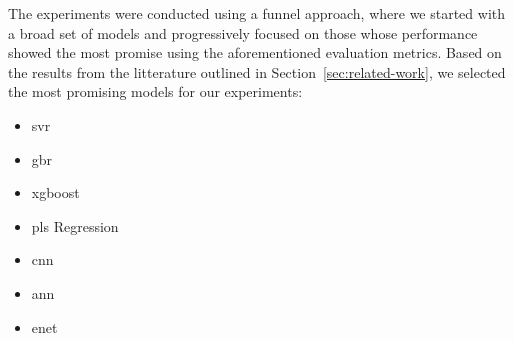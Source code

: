 The experiments were conducted using a funnel approach, where we started with a broad set of models and progressively focused on those whose performance showed the most promise using the aforementioned evaluation metrics.
Based on the results from the litterature outlined in Section~\ref{sec:related-work}, we selected the most promising models for our experiments:
\begin{itemize}
    \item \gls{svr}
    \item \gls{gbr}
    \item \gls{xgboost}
    \item \gls{pls} Regression
    \item \gls{cnn}
    \item \gls{ann}
    \item \gls{enet}
\end{itemize}



